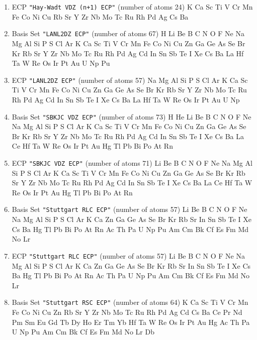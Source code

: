 \begin{enumerate}
\item ECP \verb#"Hay-Wadt VDZ (n+1) ECP"# (number of atoms 24)  \newline 
  K Ca Sc Ti V Cr Mn Fe Co Ni Cu Rb Sr Y Zr Nb Mo Tc Ru Rh Pd Ag Cs Ba


\item Basis Set \verb#"LANL2DZ ECP"# (number of atoms 67)  \newline 
  H Li Be B C N O F Ne Na Mg Al Si P S Cl Ar K Ca Sc Ti V Cr Mn Fe
 Co Ni Cu Zn Ga Ge As Se Br Kr Rb Sr Y Zr Nb Mo Tc Ru Rh Pd Ag Cd In Sn Sb
 Te I Xe Cs Ba La Hf Ta W Re Os Ir Pt Au U Np Pu


\item ECP \verb#"LANL2DZ ECP"# (number of atoms 57)  \newline 
  Na Mg Al Si P S Cl Ar K Ca Sc Ti V Cr Mn Fe Co Ni Cu Zn Ga Ge As Se Br
 Kr Rb Sr Y Zr Nb Mo Tc Ru Rh Pd Ag Cd In Sn Sb Te I Xe Cs Ba La Hf Ta W
 Re Os Ir Pt Au U Np


\item Basis Set \verb#"SBKJC VDZ ECP"# (number of atoms 73)  \newline 
  H He Li Be B C N O F Ne Na Mg Al Si P S Cl Ar K Ca Sc Ti V Cr Mn
 Fe Co Ni Cu Zn Ga Ge As Se Br Kr Rb Sr Y Zr Nb Mo Tc Ru Rh Pd Ag Cd In Sn
 Sb Te I Xe Cs Ba La Ce Hf Ta W Re Os Ir Pt Au Hg Tl Pb Bi Po At Rn


\item ECP \verb#"SBKJC VDZ ECP"# (number of atoms 71)  \newline 
  Li Be B C N O F Ne Na Mg Al Si P S Cl Ar K Ca Sc Ti V Cr Mn Fe Co
 Ni Cu Zn Ga Ge As Se Br Kr Rb Sr Y Zr Nb Mo Tc Ru Rh Pd Ag Cd In Sn Sb Te
 I Xe Cs Ba La Ce Hf Ta W Re Os Ir Pt Au Hg Tl Pb Bi Po At Rn


\item Basis Set \verb#"Stuttgart RLC ECP"# (number of atoms 57)  \newline 
  Li Be B C N O F Ne Na Mg Al Si P S Cl Ar K Ca Zn Ga Ge As Se Br Kr
 Rb Sr In Sn Sb Te I Xe Cs Ba Hg Tl Pb Bi Po At Rn Ac Th Pa U Np Pu Am Cm
 Bk Cf Es Fm Md No Lr


\item ECP \verb#"Stuttgart RLC ECP"# (number of atoms 57)  \newline 
  Li Be B C N O F Ne Na Mg Al Si P S Cl Ar K Ca Zn Ga Ge As Se Br Kr
 Rb Sr In Sn Sb Te I Xe Cs Ba Hg Tl Pb Bi Po At Rn Ac Th Pa U Np Pu Am Cm
 Bk Cf Es Fm Md No Lr


\item Basis Set \verb#"Stuttgart RSC ECP"# (number of atoms 64)  \newline 
  K Ca Sc Ti V Cr Mn Fe Co Ni Cu Zn Rb Sr Y Zr Nb Mo Tc Ru Rh Pd Ag Cd Cs
 Ba Ce Pr Nd Pm Sm Eu Gd Tb Dy Ho Er Tm Yb Hf Ta W Re Os Ir Pt Au Hg Ac Th
 Pa U Np Pu Am Cm Bk Cf Es Fm Md No Lr Db



\end{enumerate}
